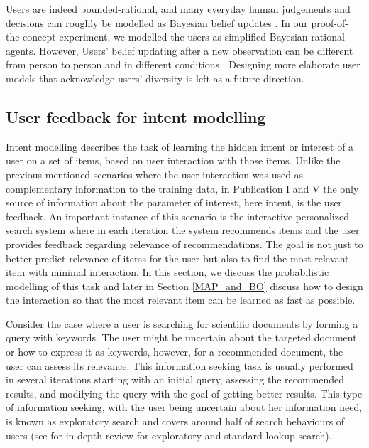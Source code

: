 \documentclass[dissertation,math,vertlayout,pdfa,colorlinks]{aaltoseries}
\begin{document}
Users are indeed bounded-rational, and many everyday human judgements and decisions can roughly be modelled as Bayesian belief updates \cite{griffiths2006optimal}. In our proof-of-the-concept experiment, we modelled the users as simplified Bayesian rational agents. However, Users' belief updating after a new observation can be different from person to person and in different conditions \cite{Hullman}. Designing more elaborate user models that acknowledge users' diversity is left as a future direction.


\subsection{User feedback for intent modelling}\label{feedback_intent_modelling}

Intent modelling describes the task of learning the hidden intent or interest of a user on a set of items, based on user interaction with those items. Unlike the previous mentioned scenarios where the user interaction was used as complementary information to the training data, in Publication I and V the only source of information about the parameter of interest, here intent, is the user feedback. An important instance of this scenario is the interactive personalized search system where in each iteration the system recommends items and the user provides feedback regarding relevance of recommendations. The goal is not just to better predict relevance of items for the user but also to find the most relevant item with minimal interaction. In this section, we discuss the probabilistic modelling of this task and later in Section \ref{MAP_and_BO} discuss how to design the interaction so that the most relevant item can be learned as fast as possible. 

Consider the case where a user is searching for scientific documents by forming a query with keywords. The user might be uncertain about the targeted document or how to express it as keywords, however, for a recommended document, the user can assess its relevance. This information seeking task is usually performed in several iterations starting with an initial query, assessing the recommended results, and modifying the query with the goal of getting better results. This type of information seeking, with the user being uncertain about her information need, is known as exploratory search \cite{Marchionini2006,white2009exploratory} and covers around half of search behaviours of users \cite{Teevan_2004} (see \cite{paba_exploratory_vs_lookup} for in depth review for exploratory and standard lookup search). 
\end{document}
